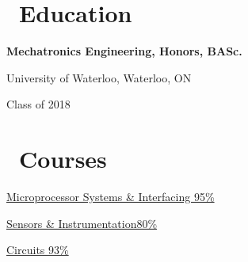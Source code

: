 \documentclass{resume}
\begin{document}
\begin{multicols}{2}

\section{\faGraduationCap\ Education}
\textbf{Mechatronics Engineering, Honors, BASc.}\par
University of Waterloo, Waterloo, ON\par
Class of 2018

\columnbreak

\section{\faBook\ Courses}

\href{http://www.ucalendar.uwaterloo.ca/1516/COURSE/course-MTE.html#MTE341}{Microprocessor Systems \& Interfacing \hfill 95\%} \par
\href{http://www.ucalendar.uwaterloo.ca/1516/COURSE/course-MTE.html#MTE220}{Sensors \& Instrumentation\hfill 80\%}\par
\href{http://www.ucalendar.uwaterloo.ca/1516/COURSE/course-MTE.html#MTE120}{Circuits \hfill 93\%}

\end{multicols}
\end{document}
